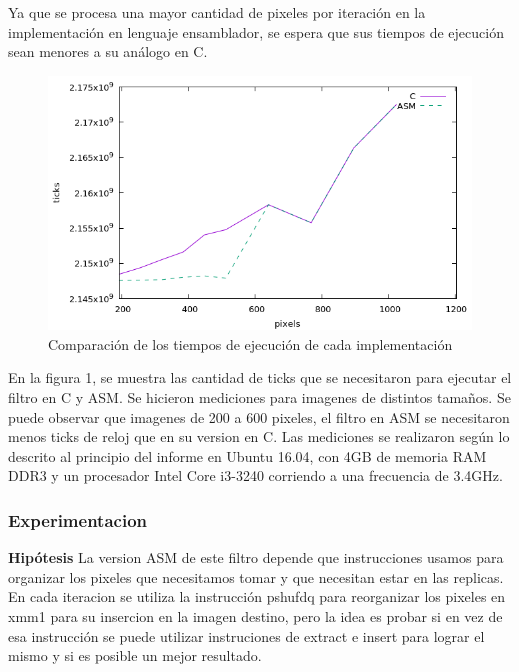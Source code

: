 \documentclass[a4paper]{article}
\begin{document}
Ya que se procesa una mayor cantidad de pixeles por iteración en la implementación en lenguaje ensamblador, se espera que sus tiempos de ejecución sean menores a su análogo en C.

\begin{figure}[H]
	\begin{center}
		\includegraphics[scale=0.77]{imagenes/smalltiles-CvsASM.png}
	\caption{Comparación de los tiempos de ejecución de cada implementación}
	\label{smalltiles_asmvsc}
  \end{center}
\end{figure}

En la figura 1, se muestra las cantidad de ticks que se necesitaron para ejecutar el filtro en C y ASM.   Se hicieron mediciones para imagenes de distintos tamaños. Se puede observar que imagenes de 200 a 600 pixeles, el filtro en ASM se necesitaron menos ticks de reloj que en su version en C.
Las mediciones se realizaron según lo descrito al principio del informe en Ubuntu 16.04, con 4GB de memoria RAM DDR3 y un procesador Intel Core i3-3240 corriendo a una frecuencia de 3.4GHz.

\subsubsection{Experimentacion}
\textbf{Hipótesis}
\newline
La version ASM de este filtro depende que instrucciones usamos para organizar los pixeles que necesitamos tomar  y que necesitan estar en las replicas. En cada iteracion se utiliza la instrucción pshufdq para reorganizar los pixeles en xmm1 para su insercion en la imagen destino, pero la idea es probar si en vez de esa instrucción se puede utilizar instruciones de extract e insert para lograr el mismo y si es posible un mejor resultado.
\end{document}
